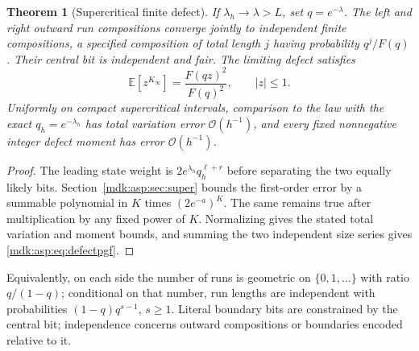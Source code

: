 \documentclass[11pt,letterpaper]{article}
\numberwithin{equation}{section}
\newtheorem{theorem}{Theorem}[section]
\theoremstyle{remark}\newtheorem{remark}[theorem]{Remark}
\newcommand{\Oh}{\mathcal O}\newcommand{\Q}{\mathbb Q}\newcommand{\N}{\mathbb N}\newcommand{\R}{\mathbb R}
\begin{document}
\begin{theorem}[Supercritical finite defect]\label{mdk:asp:thm:law-super}
If $\lambda_h\to\lambda>L$, set $q=e^{-\lambda}$. The left and right outward run compositions converge jointly to independent finite compositions, a specified composition of total length $j$ having probability $q^j/F(q)$. Their central bit is independent and fair. The limiting defect satisfies
\begin{equation}\label{mdk:asp:eq:defectpgf}
\mathbb E[z^{K_\infty}]=\frac{F(qz)^2}{F(q)^2},\qquad |z|\le1.
\end{equation}
Uniformly on compact supercritical intervals, comparison to the law with the exact $q_h=e^{-\lambda_h}$ has total variation error $\Oh(h^{-1})$, and every fixed nonnegative integer defect moment has error $\Oh(h^{-1})$.
\end{theorem}
\begin{proof}
The leading state weight is $2e^{\lambda_h}q_h^{\ell+r}$ before separating the two equally likely bits. Section~\ref{mdk:asp:sec:super} bounds the first-order error by a summable polynomial in $K$ times $(2e^{-a})^K$. The same remains true after multiplication by any fixed power of $K$. Normalizing gives the stated total variation and moment bounds, and summing the two independent size series gives \eqref{mdk:asp:eq:defectpgf}.
\end{proof}
Equivalently, on each side the number of runs is geometric on $\{0,1,\ldots\}$ with ratio $q/(1-q)$; conditional on that number, run lengths are independent with probabilities $(1-q)q^{s-1}$, $s\ge1$. Literal boundary bits are constrained by the central bit; independence concerns outward compositions or boundaries encoded relative to it.
\end{document}
